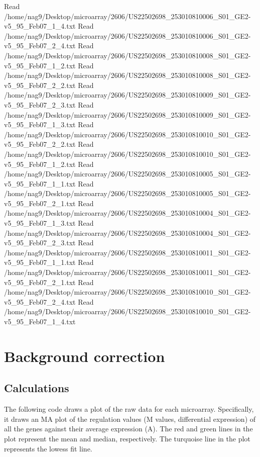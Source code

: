 \documentclass[titlepage]{article}
\begin{document}
\begin{Schunk}
\begin{Soutput}
Read /home/nag9/Desktop/microarray/2606/US22502698_253010810006_S01_GE2-v5_95_Feb07_1_4.txt 
Read /home/nag9/Desktop/microarray/2606/US22502698_253010810006_S01_GE2-v5_95_Feb07_2_4.txt 
Read /home/nag9/Desktop/microarray/2606/US22502698_253010810008_S01_GE2-v5_95_Feb07_1_2.txt 
Read /home/nag9/Desktop/microarray/2606/US22502698_253010810008_S01_GE2-v5_95_Feb07_2_2.txt 
Read /home/nag9/Desktop/microarray/2606/US22502698_253010810009_S01_GE2-v5_95_Feb07_2_3.txt 
Read /home/nag9/Desktop/microarray/2606/US22502698_253010810009_S01_GE2-v5_95_Feb07_1_3.txt 
Read /home/nag9/Desktop/microarray/2606/US22502698_253010810010_S01_GE2-v5_95_Feb07_2_2.txt 
Read /home/nag9/Desktop/microarray/2606/US22502698_253010810010_S01_GE2-v5_95_Feb07_1_2.txt 
Read /home/nag9/Desktop/microarray/2606/US22502698_253010810005_S01_GE2-v5_95_Feb07_1_1.txt 
Read /home/nag9/Desktop/microarray/2606/US22502698_253010810005_S01_GE2-v5_95_Feb07_2_1.txt 
Read /home/nag9/Desktop/microarray/2606/US22502698_253010810004_S01_GE2-v5_95_Feb07_1_3.txt 
Read /home/nag9/Desktop/microarray/2606/US22502698_253010810004_S01_GE2-v5_95_Feb07_2_3.txt 
Read /home/nag9/Desktop/microarray/2606/US22502698_253010810011_S01_GE2-v5_95_Feb07_1_1.txt 
Read /home/nag9/Desktop/microarray/2606/US22502698_253010810011_S01_GE2-v5_95_Feb07_2_1.txt 
Read /home/nag9/Desktop/microarray/2606/US22502698_253010810010_S01_GE2-v5_95_Feb07_2_4.txt 
Read /home/nag9/Desktop/microarray/2606/US22502698_253010810010_S01_GE2-v5_95_Feb07_1_4.txt 
\end{Soutput}
\end{Schunk}

\section{Background correction}
\subsection{Calculations}
The following code draws a plot of the raw data for each microarray.  Specifically, it draws an MA plot of the regulation values (M values,  differential expression) of all the genes against their average  expression (A). The red and green lines in the plot represent the  mean and median, respectively. The turquoise line in the plot  represents the lowess fit line.
\end{document}
